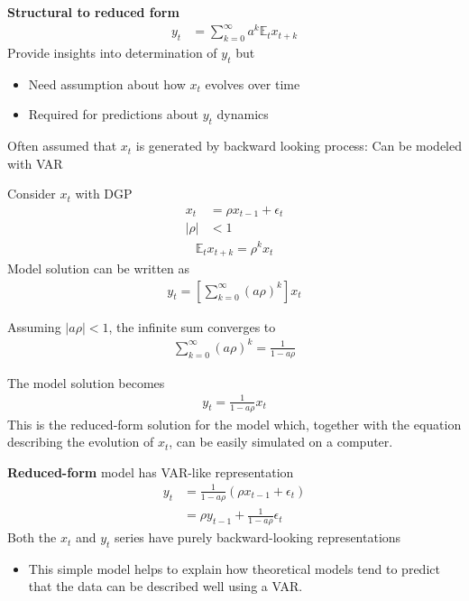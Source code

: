 \documentclass{beamer}
\begin{document}
\begin{frame}
  \textbf{Structural to reduced form}
  \begin{align}
    y_t &= \sum^\infty_{k=0}a^k\mathbb{E}_tx_{t+k}
  \end{align}
  Provide insights into determination of $y_t$ but
  \begin{itemize}
    \item Need assumption about how $x_t$ evolves over time
    \item Required for predictions about $y_t$ dynamics
  \end{itemize}
  Often assumed that $x_t$ is generated by backward looking process: Can be modeled with VAR 
\end{frame}

\begin{frame}
 Consider $x_t$ with DGP  
\begin{align}
  x_t&=\rho x_{t-1} + \epsilon_t \\ \nonumber 
  |\rho| &< 1
\end{align}
\begin{align}
  \mathbb{E}_tx_{t+k}=\rho^kx_t
\end{align}
 Model solution can be written as 
\begin{align}
  y_t=\left[ \sum^{\infty}_{k=0}(a\rho)^k \right]x_t
\end{align}
\end{frame}

\begin{frame} 
  Assuming $|a\rho|<1$, the infinite sum converges to
  \begin{align}
  \sum^{\infty}_{k=0}(a\rho)^k=\frac{1}{1-a\rho}
\end{align}

The model solution becomes
\begin{align}
  y_t=\frac{1}{1-a\rho}x_t
\end{align}
This is the reduced-form solution for the model which, together with the equation describing the evolution of $x_t$, can be easily simulated on a computer. 
\end{frame}

\begin{frame}
  \textbf{Reduced-form} model has VAR-like representation
  \begin{align}
  y_t &= \frac{1}{1-a\rho}(\rho x_{t-1}+\epsilon_t)\\
      &= \rho y_{t-1} +  \frac{1}{1-a\rho}\epsilon_t
  \end{align}
  Both the $x_t$ and $y_t$ series have purely backward-looking representations
  \begin{itemize}
    \item This simple model helps to explain how theoretical models tend to predict that the data can be described well using a VAR.
  \end{itemize}
\end{frame}
\end{document}
